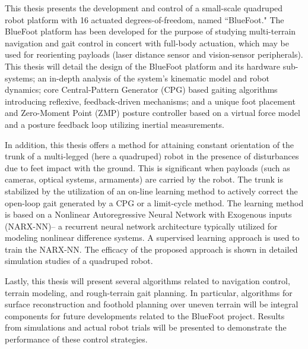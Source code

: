 {}
{
	This thesis presents the development and control of a small-scale quadruped robot platform with 16 actuated degrees-of-freedom, named ``BlueFoot." The BlueFoot platform has been developed for the purpose of studying multi-terrain navigation and gait control in concert with full-body actuation, which may be used for reorienting payloads (\EG laser distance sensor and vision-sensor peripherals). This thesis will detail the design of the BlueFoot platform and its hardware sub-systems; an in-depth analysis of the system's kinematic model and robot dynamics; core Central-Pattern Generator (CPG) based gaiting algorithms introducing reflexive, feedback-driven mechanisms; and a unique foot placement and Zero-Moment Point (ZMP) posture controller based on a virtual force model and a posture feedback loop utilizing inertial measurements. %


	In addition, this thesis offers a method for attaining constant orientation of the trunk of a multi-legged (here a quadruped) robot in the presence of disturbances due to feet impact with the ground. This is significant when payloads (such as cameras, optical systems, armaments) are carried by the robot.  The trunk is stabilized by the utilization of an on-line learning method to actively correct the open-loop gait generated by a CPG or a limit-cycle method. The learning method is based on a Nonlinear Autoregressive Neural Network with Exogenous inputs (NARX-NN)-- a recurrent neural network architecture typically utilized for modeling nonlinear difference systems. A supervised learning approach is used to train the NARX-NN. 
	The efficacy of the proposed approach is shown in detailed simulation studies of a quadruped robot. 

	Lastly, this thesis will present several algorithms related to navigation control, terrain modeling, and rough-terrain gait planning. In particular, algorithms for surface reconstruction and foothold planning over uneven terrain will be integral components for future developments related to the BlueFoot project. Results from simulations and actual robot trials will be presented to demonstrate the performance of these control strategies. 
\clearpage}
{\endmsabstract}
